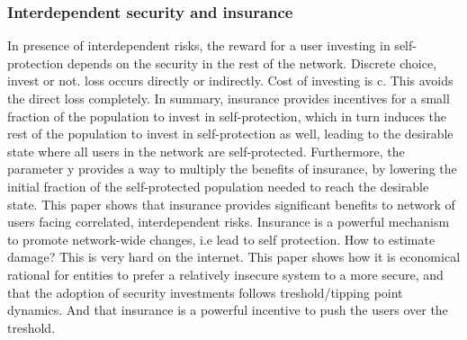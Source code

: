 \subsubsection{Interdependent security and insurance}
In presence of interdependent risks, the reward for a user investing in self-protection depends on the security in the rest of the network.
Discrete choice, invest or not. loss occurs directly or indirectly. Cost of investing is c. This avoids the direct loss completely. 
In summary, insurance provides incentives for a
small fraction of the population to invest in self-protection, which in turn induces the rest
of the population to invest in self-protection as well, leading to the desirable state where
all users in the network are self-protected. Furthermore, the parameter y provides a way
to multiply the benefits of insurance, by lowering the initial fraction of the self-protected
population needed to reach the desirable state.
This paper shows that insurance provides significant benefits to network of users facing correlated, 
interdependent risks. Insurance is a powerful mechanism to promote network-wide changes, i.e lead to self protection.
How to estimate damage? This is very hard on the internet. 
This paper shows how it is economical rational for entities to prefer a relatively 
insecure system to a more secure, and that the adoption of security investments follows treshold/tipping point dynamics. 
And that insurance is a powerful incentive to push the users over the treshold.


